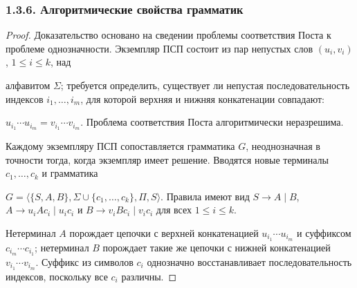 \documentclass[mathserif,12pt,aspectratio=169]{beamer}
\let\leq\leqslant
\begin{document}
\begin{frame}[t]
	\frametitle{1.3.6. Алгоритмические свойства грамматик }
	\setlength{\parskip}{1pt}
	\sloppy
	
	\begin{proof}
		\par\vspace{-4pt}
		Доказательство основано на сведении проблемы соответствия Поста к проблеме однозначности. Экземпляр ПСП состоит из пар непустых слов $(u_i,v_i)$, $1\leq i\leq k$, над
		
		алфавитом $\Sigma$; требуется определить, существует ли непустая последовательность индексов $i_1,\ldots,i_m$, для которой верхняя и нижняя конкатенации совпадают: 
		
		$u_{i_1}\cdots u_{i_m}=v_{i_1}\cdots v_{i_m}$. Проблема соответствия Поста алгоритмически неразрешима.
		
		Каждому экземпляру ПСП сопоставляется грамматика $G$, неоднозначная в точности тогда, когда экземпляр имеет решение. Вводятся новые терминалы $c_1,\ldots,c_k$ и грамматика
		
		$G=\langle\{S,A,B\},\Sigma\cup\{c_1,\ldots,c_k\},\Pi,S\rangle$. Правила имеют вид $S\to A\mid B$, $A\to u_iAc_i\mid u_ic_i$ и $B\to v_iBc_i\mid v_ic_i$ для всех $1\leq i\leq k$.
		
		Нетерминал $A$ порождает цепочки с верхней конкатенацией $u_{i_1}\cdots u_{i_m}$ и суффиксом $c_{i_m}\cdots c_{i_1}$; нетерминал $B$ порождает такие же цепочки с нижней конкатенацией $v_{i_1}\cdots v_{i_m}$. Суффикс из символов $c_i$ однозначно восстанавливает последовательность индексов, поскольку все $c_i$ различны.
	\end{proof}
	
\end{frame}
\end{document}
